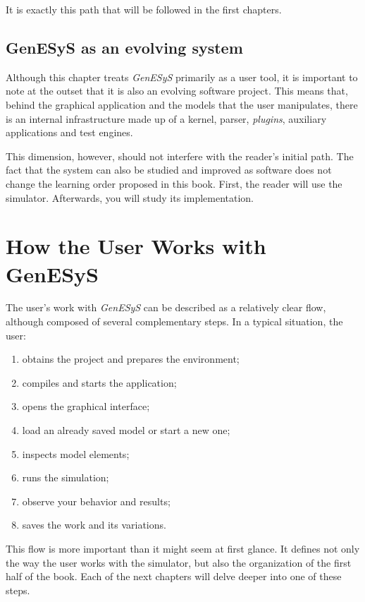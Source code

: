 It is exactly this path that will be followed in the first chapters.

\subsection{GenESyS as an evolving system}
\label{subsec:cap1_genesys_sistema_evolucao}

Although this chapter treats \textit{GenESyS} primarily as a user tool, it is important to note at the outset that it is also an evolving software project. This means that, behind the graphical application and the models that the user manipulates, there is an internal infrastructure made up of a kernel, parser, \textit{plugins}, auxiliary applications and test engines.

This dimension, however, should not interfere with the reader’s initial path. The fact that the system can also be studied and improved as software does not change the learning order proposed in this book. First, the reader will use the simulator. Afterwards, you will study its implementation.

\section{How the User Works with GenESyS}
\label{sec:cap1_como_usuario_trabalha}

The user's work with \textit{GenESyS} can be described as a relatively clear flow, although composed of several complementary steps. In a typical situation, the user:

\begin{enumerate}
\item obtains the project and prepares the environment;
\item compiles and starts the application;
\item opens the graphical interface;
\item load an already saved model or start a new one;
\item inspects model elements;
\item runs the simulation;
\item observe your behavior and results;
\item saves the work and its variations.
\end{enumerate}

This flow is more important than it might seem at first glance. It defines not only the way the user works with the simulator, but also the organization of the first half of the book. Each of the next chapters will delve deeper into one of these steps.

